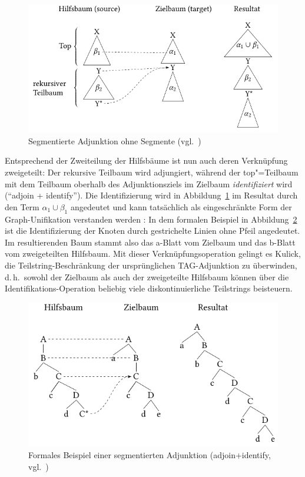 \begin{figure}[t]
\centering
\includegraphics{graphics/abb611.pdf}
\caption{Segmentierte Adjunktion ohne Segmente (vgl.\ \citealt[Fig.~6.1]{Kulick:00})\label{fig-segmented-adj}}
\end{figure}

Entsprechend der Zweiteilung der Hilfsbäume ist nun auch deren Verknüpfung zweigeteilt: Der rekursive Teilbaum wird adjungiert, während der top"=Teilbaum mit dem Teilbaum oberhalb des Adjunktionsziels im Zielbaum {\it identifiziert}  wird ("`adjoin + identify"'). Die Identifizierung wird in Abbildung~\ref{fig-segmented-adj} im Resultat durch den Term $\alpha_1 \cup \beta_1$ angedeutet und kann tatsächlich als eingeschränkte Form der Graph-Unifikation verstanden werden \citep[93f]{Kulick:00}: In dem formalen Beispiel in Abbildung~\ref{fig-seg-formal} ist die Identifizierung der Knoten durch gestrichelte Linien ohne Pfeil angedeutet. Im resultierenden Baum stammt also das a-Blatt vom Zielbaum und das b-Blatt vom zweigeteilten Hilfsbaum. Mit dieser Verknüpfungsoperation gelingt es Kulick, die Teilstring-Beschränkung der ursprünglichen TAG-Adjunktion zu überwinden, d.\,h.\ sowohl der Zielbaum als auch der zweigeteilte Hilfsbaum können über die Identifikations-Operation beliebig viele diskontinuierliche Teilstrings beisteuern. 

\begin{figure}[t] 
\centering
\includegraphics{graphics/abb612.pdf}
\caption{Formales Beispiel einer segmentierten Adjunktion (adjoin+identify, vgl.\ \citealt[(145), (146)]{Kulick:00})\label{fig-seg-formal}}
\end{figure} 
 
